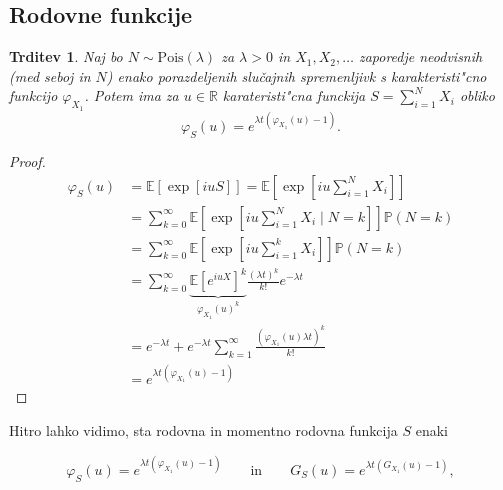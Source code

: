 \documentclass[12pt, a4paper, reqno]{amsart}
\theoremstyle{definition}
\theoremstyle{plain}
\newtheorem{trditev}[definicija]{Trditev}
\newcommand{\R}{\mathbb{R}}
\newcommand{\E}{\mathbb{E}}
\newcommand{\Prob}{\mathbb{P}}
\newcommand{\1}{\mathds{1}}
\newcommand{\Pois}[1]{\text{Pois}(#1)}
\begin{document}
    \subsection{Rodovne funkcije}

    \begin{trditev}
        Naj bo $N\sim \Pois{\lambda}$  za $\lambda >0$ in $X_1, X_2, \dots$ zaporedje neodvisnih (med seboj in $N$)
        enako porazdeljenih slučajnih spremenljivk s karakteristi"cno funkcijo $\varphi_{X_1}$. Potem ima za $u\in\R$
        karateristi"cna funckija $S = \sum_{i=1}^NX_i$ obliko
        \begin{equation*}
            \varphi_{S}(u) = e^{\lambda t\left(\varphi_{X_1}(u) - 1\right)}.
        \end{equation*}
        \label{trd:MomentGener}
    \end{trditev}
    
    \begin{proof}
        \begin{align}
            \varphi_{S}(u) 
                    &= \E\left[\exp\left[iuS\right]\right] = 
                        \E\left[\exp\left[iu\sum_{i = 1}^{N}X_i\right]\right] \nonumber\\
                    &= \sum_{k=0}^{\infty}
                        \E\left[\exp\left[iu\sum_{i = 1}^{N}X_i \mid N=k\right]\right]\Prob\left(N = k\right) \nonumber \\ 
                    &= \sum_{k=0}^{\infty}
                        \E\left[\exp\left[iu\sum_{i = 1}^kX_i\right]\right]\Prob\left(N = k\right) \nonumber \\
                    &= \sum_{k=0}^{\infty}
                        \underbrace{\E\left[e^{iuX}\right]^k}_{\varphi_{X_1}(u)^k}\frac{(\lambda t)^k}{k!}e^{-\lambda t} \label{eq:MomentS}\\ 
                    &= e^{-\lambda t} + e^{-\lambda t}\sum_{k=1}^\infty\frac{\left(\varphi_{X_1}(u)\lambda t\right)^k}{k!} \nonumber \\
                    &= e^{\lambda t\left(\varphi_{X_1}(u) - 1\right)} \nonumber
        \end{align}
    \end{proof}

    Hitro lahko vidimo,  sta rodovna in momentno rodovna funkcija $S$ enaki

    \begin{equation*}
        \varphi_{S}(u) = e^{\lambda t\left(\varphi_{X_1}(u) - 1\right)} \qquad \text{in} \qquad 
        G_{S}(u) = e^{\lambda t\left(G_{X_1}(u) - 1\right)},
    \end{equation*} 
\end{document}
